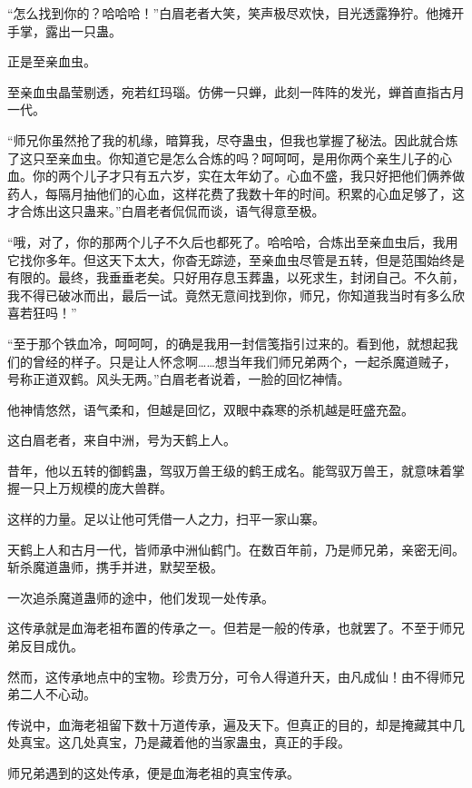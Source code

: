 
\begin{this_body}

“怎么找到你的？哈哈哈！”白眉老者大笑，笑声极尽欢快，目光透露狰狞。他摊开手掌，露出一只蛊。

正是至亲血虫。

至亲血虫晶莹剔透，宛若红玛瑙。仿佛一只蝉，此刻一阵阵的发光，蝉首直指古月一代。

“师兄你虽然抢了我的机缘，暗算我，尽夺蛊虫，但我也掌握了秘法。因此就合炼了这只至亲血虫。你知道它是怎么合炼的吗？呵呵呵，是用你两个亲生儿子的心血。你的两个儿子才只有五六岁，实在太年幼了。心血不盛，我只好把他们俩养做药人，每隔月抽他们的心血，这样花费了我数十年的时间。积累的心血足够了，这才合炼出这只蛊来。”白眉老者侃侃而谈，语气得意至极。

“哦，对了，你的那两个儿子不久后也都死了。哈哈哈，合炼出至亲血虫后，我用它找你多年。但这天下太大，你杳无踪迹，至亲血虫尽管是五转，但是范围始终是有限的。最终，我垂垂老矣。只好用存息玉葬蛊，以死求生，封闭自己。不久前，我不得已破冰而出，最后一试。竟然无意间找到你，师兄，你知道我当时有多么欣喜若狂吗！”

“至于那个铁血冷，呵呵呵，的确是我用一封信笺指引过来的。看到他，就想起我们的曾经的样子。只是让人怀念啊……想当年我们师兄弟两个，一起杀魔道贼子，号称正道双鹤。风头无两。”白眉老者说着，一脸的回忆神情。

他神情悠然，语气柔和，但越是回忆，双眼中森寒的杀机越是旺盛充盈。

这白眉老者，来自中洲，号为天鹤上人。

昔年，他以五转的御鹤蛊，驾驭万兽王级的鹤王成名。能驾驭万兽王，就意味着掌握一只上万规模的庞大兽群。

这样的力量。足以让他可凭借一人之力，扫平一家山寨。

天鹤上人和古月一代，皆师承中洲仙鹤门。在数百年前，乃是师兄弟，亲密无间。斩杀魔道蛊师，携手并进，默契至极。

一次追杀魔道蛊师的途中，他们发现一处传承。

这传承就是血海老祖布置的传承之一。但若是一般的传承，也就罢了。不至于师兄弟反目成仇。

然而，这传承地点中的宝物。珍贵万分，可令人得道升天，由凡成仙！由不得师兄弟二人不心动。

传说中，血海老祖留下数十万道传承，遍及天下。但真正的目的，却是掩藏其中几处真宝。这几处真宝，乃是藏着他的当家蛊虫，真正的手段。

师兄弟遇到的这处传承，便是血海老祖的真宝传承。


\end{this_body}

